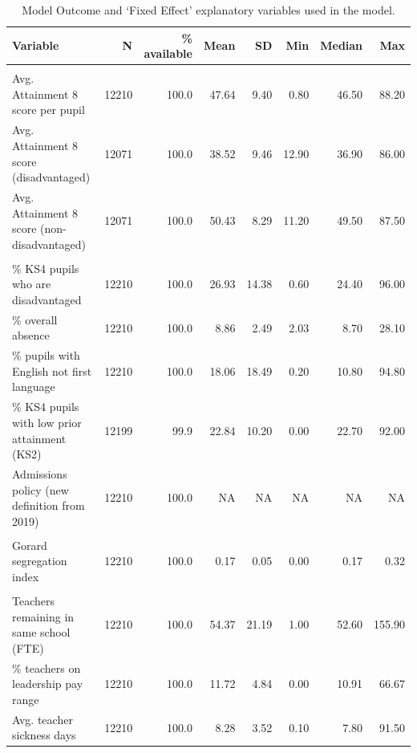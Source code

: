 \documentclass[
  11pt,
]{article}
\begin{document}
\begin{longtable}[t]{lrrrrrrr}

\caption{\label{tbl-variables}Model Outcome and `Fixed Effect'
explanatory variables used in the model.}

\tabularnewline

\toprule
Variable & N & \% available & Mean & SD & Min & Median & Max\\
\midrule
\addlinespace[0.3em]
\multicolumn{8}{l}{\textbf{Outcome}}\\
\hspace{1em}Avg. Attainment 8 score per pupil & 12210 & 100.0 & 47.64 & 9.40 & 0.80 & 46.50 & 88.20\\
\hspace{1em}Avg. Attainment 8 score (disadvantaged) & 12071 & 100.0 & 38.52 & 9.46 & 12.90 & 36.90 & 86.00\\
\hspace{1em}Avg. Attainment 8 score (non-disadvantaged) & 12071 & 100.0 & 50.43 & 8.29 & 11.20 & 49.50 & 87.50\\
\addlinespace[0.3em]
\multicolumn{8}{l}{\textbf{School composition}}\\
\hspace{1em}\% KS4 pupils who are disadvantaged & 12210 & 100.0 & 26.93 & 14.38 & 0.60 & 24.40 & 96.00\\
\hspace{1em}\% overall absence & 12210 & 100.0 & 8.86 & 2.49 & 2.03 & 8.70 & 28.10\\
\hspace{1em}\% pupils with English not first language & 12210 & 100.0 & 18.06 & 18.49 & 0.20 & 10.80 & 94.80\\
\hspace{1em}\% KS4 pupils with low prior attainment (KS2) & 12199 & 99.9 & 22.84 & 10.20 & 0.00 & 22.70 & 92.00\\
\hspace{1em}Admissions policy (new definition from 2019) & 12210 & 100.0 & NA & NA & NA & NA & NA\\
\addlinespace[0.3em]
\multicolumn{8}{l}{\textbf{Segregation (LA-level)}}\\
\hspace{1em}Gorard segregation index & 12210 & 100.0 & 0.17 & 0.05 & 0.00 & 0.17 & 0.32\\
\addlinespace[0.3em]
\multicolumn{8}{l}{\textbf{Workforce}}\\
\hspace{1em}Teachers remaining in same school (FTE) & 12210 & 100.0 & 54.37 & 21.19 & 1.00 & 52.60 & 155.90\\
\hspace{1em}\% teachers on leadership pay range & 12210 & 100.0 & 11.72 & 4.84 & 0.00 & 10.91 & 66.67\\
\hspace{1em}Avg. teacher sickness days & 12210 & 100.0 & 8.28 & 3.52 & 0.10 & 7.80 & 91.50\\
\bottomrule

\end{longtable}
\end{document}
